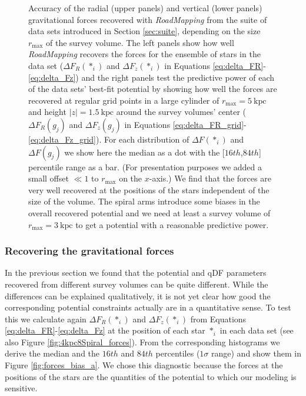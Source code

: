 \documentclass[iop,revtex4,numberedappendix,appendixfloats]{emulateapj}
\newcommand{\RM}{{\sl RoadMapping}}
\begin{document}
\begin{figure}[!htbp]
\caption{Accuracy of the radial (upper panels) and vertical (lower panels) gravitational forces recovered with \RM{} from the suite of data sets introduced in Section \ref{sec:suite}, depending on the size $r_\text{max}$ of the survey volume. The left panels show how well \RM{} recovers the forces for the ensemble of stars in the data set ($\Delta F_{R}(*_i)$ and $\Delta F_{z}(*_i)$ in Equations \eqref{eq:delta_FR}-\eqref{eq:delta_Fz}) and the right panels test the predictive power of each of the data sets' best-fit potential by showing how well the forces are recovered at regular grid points in a large cylinder of $r_\text{max}=5~\text{kpc}$ and height $|z|=1.5~\text{kpc}$ around the survey volumes' center ($\Delta F_{R}(g_j)$ and $\Delta F_{z}(g_j)$ in Equations \eqref{eq:delta_FR_grid}-\eqref{eq:delta_Fz_grid}). For each distribution of $\Delta F(*_i)$ and $\Delta F(g_j)$ we show here the median as a dot with the  [$16th$,$84th$] percentile range as a bar. (For presentation purposes we added a small offset $\ll 1$ to $r_\text{max}$ on the $x$-axis.) We find that the forces are very well recovered at the positions of the stars independent of the size of the volume. The spiral arms introduce some biases in the overall recovered potential and we need at least a survey volume of $r_\text{max}=3~\text{kpc}$ to get a potential with a reasonable predictive power.}
\label{fig:forces_bias}
\end{figure}


\subsubsection{Recovering the gravitational forces}\label{sec:forces_bias}

In the previous section we found that the potential and qDF parameters recovered from different survey volumes can be quite different. While the differences can be explained qualitatively, it is not yet clear how good the corresponding potential constraints actually are in a quantitative sense. To test this we calculate again $\Delta F_R(*_i)$ and $\Delta F_z(*_i)$ from Equations \eqref{eq:delta_FR}-\eqref{eq:delta_Fz} at the position of each star $*_i$ in each data set (see also Figure \ref{fig:4kpc8Spiral_forces}). From the corresponding histograms we derive the median and the $16th$ and $84th$ percentiles ($1\sigma$ range) and show them in Figure \ref{fig:forces_bias_a}. We chose this diagnostic because the forces at the positions of the stars are the quantities of the potential to which our modeling is sensitive.
\end{document}
